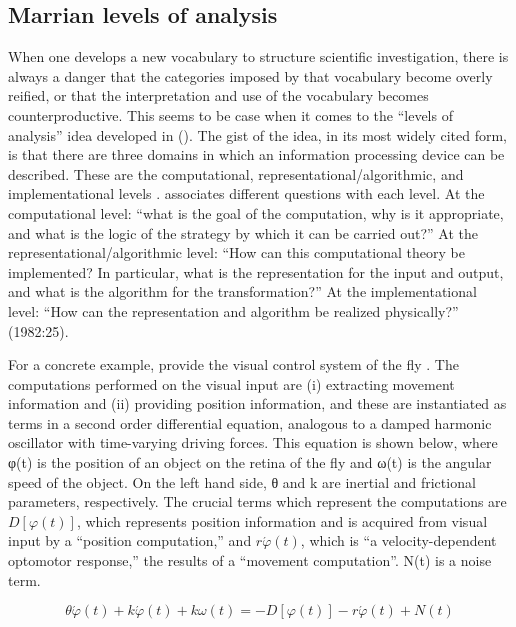 \subsection{Marrian levels of analysis}

When one develops a new vocabulary to structure scientific investigation, there is always a danger that the categories imposed by that vocabulary become overly reified, or that the interpretation and use of the vocabulary becomes counterproductive. This seems to be case when it comes to the “levels of analysis” idea developed in (\citealt{Marr1982,MarrPoggio1977}). The gist of the idea, in its most widely cited form, is that there are three domains in which an information processing device can be described. These are the computational, representational/algorithmic, and implementational levels \citep{Marr1982}. \citet{Marr1982} associates different questions with each level. At the computational level: “what is the goal of the computation, why is it appropriate, and what is the logic of the strategy by which it can be carried out?” At the representational/algorithmic level: “How can this computational theory be implemented? In particular, what is the representation for the input and output, and what is the algorithm for the transformation?” At the implementational level: “How  can the representation and algorithm be realized physically?” (1982:25).

  For a concrete example, \citet{MarrPoggio1977} provide the visual control system of the fly \citep{ReichardtPoggio1976}. The computations performed on the visual input are (i) extracting movement information and (ii) providing position information, and these are instantiated as terms in a second order differential equation, analogous to a damped harmonic oscillator with time-varying driving forces. This equation is shown below, where  φ(t) is the position of an object on the retina of the fly and ω(t) is the angular speed of the object. On the left hand side, θ and k are inertial and frictional parameters, respectively. The crucial terms which represent the computations are  $D\left[\varphi \left(t\right)\right]$, which represents position information and is acquired from visual input by a “position computation,” and  $r\acute{{\varphi} }\left(t\right)$, which is “a velocity-dependent optomotor response,” the results of a “movement computation”. N(t) is a noise term.

\begin{equation*}
\theta \acute{{\varphi} }\left(t\right)+k\acute{{\varphi} }\left(t\right)+\mathit{k\omega} \left(t\right)=-D\left[\varphi \left(t\right)\right]-r\acute{{\varphi} }\left(t\right)+N\left(t\right)
\end{equation*}

